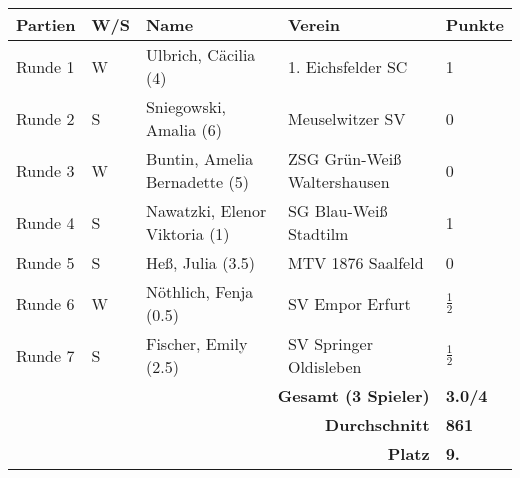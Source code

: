 \begin{tabular}{|l|l|l|l|l|}
\hline
\textbf{Partien} & \textbf{W/S} & \textbf{Name} & \textbf{Verein} & \textbf{Punkte} \\ \hline
Runde 1 & W & Ulbrich, Cäcilia (4) & 1. Eichsfelder SC & 1 \\ \hline
Runde 2 & S & Sniegowski, Amalia (6) & Meuselwitzer SV & 0 \\ \hline
Runde 3 & W & Buntin, Amelia Bernadette (5) & ZSG Grün-Weiß Waltershausen & 0 \\ \hline
Runde 4 & S & Nawatzki, Elenor Viktoria (1) & SG Blau-Weiß Stadtilm & 1 \\ \hline
Runde 5 & S & Heß, Julia (3.5) & MTV 1876 Saalfeld & 0 \\ \hline
Runde 6 & W & Nöthlich, Fenja (0.5) & SV Empor Erfurt & \(\frac{1}{2}\) \\ \hline
Runde 7 & S & Fischer, Emily (2.5) & SV Springer Oldisleben & \(\frac{1}{2}\) \\ \hline
\multicolumn{4}{|r|}{\textbf{Gesamt (3 Spieler)}} & \textbf{3.0/4} \\ \hline
\multicolumn{4}{|r|}{\textbf{Durchschnitt}} & \textbf{861} \\ \hline
\multicolumn{4}{|r|}{\textbf{Platz}} & \textbf{9.} \\ \hline
\end{tabular}

